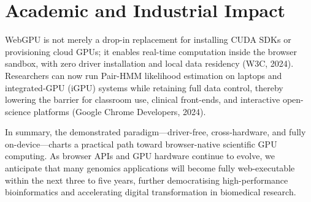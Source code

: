 \documentclass[PhD]{PHlab-thesis}
\begin{document}
\section{Academic and Industrial Impact}

WebGPU is not merely a drop-in replacement for installing CUDA SDKs or provisioning cloud GPUs; it enables real-time computation inside the browser sandbox, with zero driver installation and local data residency (W3C, 2024).  
Researchers can now run Pair-HMM likelihood estimation on laptops and integrated-GPU (iGPU) systems while retaining full data control, thereby lowering the barrier for classroom use, clinical front-ends, and interactive open-science platforms (Google Chrome Developers, 2024).

In summary, the demonstrated paradigm—driver-free, cross-hardware, and fully on-device—charts a practical path toward browser-native scientific GPU computing.  
As browser APIs and GPU hardware continue to evolve, we anticipate that many genomics applications will become fully web-executable within the next three to five years, further democratising high-performance bioinformatics and accelerating digital transformation in biomedical research.
\end{document}
